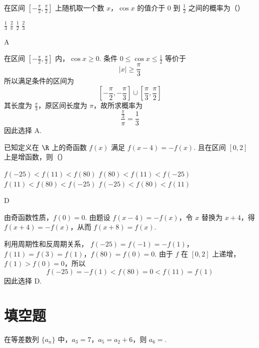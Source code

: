 \begin{problem}
在区间 \(\left[-\frac{\pi}{2}, \frac{\pi}{2}\right]\) 上随机取一个数 \(x\)，\(\cos x\) 的值介于 \(0\) 到 \(\frac{1}{2}\) 之间的概率为（\quad）

\choices
    {\( \frac{1}{3} \)}
    {\( \frac{2}{\pi} \)}
    {\( \frac{1}{2} \)}
    {\( \frac{2}{3} \)}
\end{problem}

\begin{answer}
A
\end{answer}

\begin{solution}
在区间 \(\left[-\frac\pi2,\frac\pi2\right]\) 内，\(\cos x\geqslant0\). 条件 \(0\leqslant\cos x\leqslant\frac12\) 等价于
\[
\lvert x\rvert\geqslant\frac\pi3
\]
所以满足条件的区间为
\[
\left[-\frac\pi2,-\frac\pi3\right]\cup\left[\frac\pi3,\frac\pi2\right]
\]
其长度为 \(\frac\pi3\)，原区间长度为 \(\pi\)，故所求概率为
\[
\frac{\frac\pi3}{\pi}=\frac13
\]
因此选择 A.
\end{solution}

\begin{problem}
已知定义在 \(\R\) 上的奇函数 \(f(x)\) 满足 \(f(x - 4) = -f(x)\). 且在区间 \([0,2]\) 上是增函数，则（\quad）

\choices
    {\(f(-25) < f(11) < f(80)\)}
    {\(f(80) < f(11) < f(-25)\)}
    {\(f(11) < f(80) < f(-25)\)}
    {\(f(-25) < f(80) < f(11)\)}
\end{problem}

\begin{answer}
D
\end{answer}

\begin{solution}
由奇函数性质，\(f(0)=0\). 由题设 \(f(x-4)=-f(x)\)，令 \(x\) 替换为 \(x+4\)，得 \(f(x+4)=-f(x)\)，从而 \(f(x+8)=f(x)\).

利用周期性和反周期关系，
\(f(-25)=f(-1)=-f(1)\)，\(f(11)=f(3)=f(1)\)，\(f(80)=f(0)=0\).
由于 \(f\) 在 \([0,2]\) 上递增，\(f(1)>f(0)=0\)，所以
\[
f(-25)=-f(1)<f(80)=0<f(11)=f(1)
\]
因此选择 D.
\end{solution}

\section{填空题}

\begin{problem}
在等差数列 \(\{a_{n}\}\) 中，\(a_{3} = 7\)，\(a_{5} = a_{2} + 6\)，则 \(a_{6} = \)\fillinblank{}.
\end{problem}


